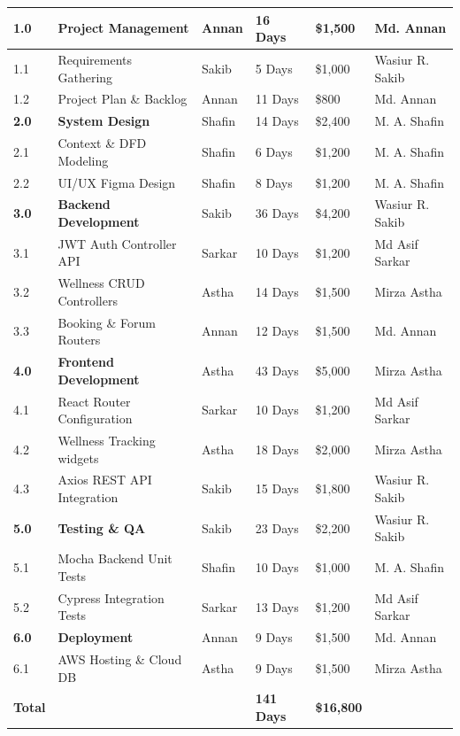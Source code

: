 \documentclass[a4paper,11pt]{report}
\begin{document}
\begin{longtable}{|p{1.2cm}|p{4.5cm}|p{2cm}|p{1.8cm}|p{1.5cm}|p{2.5cm}|}
\textbf{1.0} & \textbf{Project Management} & Annan & 16 Days & \$1,500 & Md. Annan \\ \hline
1.1 & Requirements Gathering & Sakib & 5 Days & \$1,000 & Wasiur R. Sakib \\ \hline
1.2 & Project Plan \& Backlog & Annan & 11 Days & \$800 & Md. Annan \\ \hline
\textbf{2.0} & \textbf{System Design} & Shafin & 14 Days & \$2,400 & M. A. Shafin \\ \hline
2.1 & Context \& DFD Modeling & Shafin & 6 Days & \$1,200 & M. A. Shafin \\ \hline
2.2 & UI/UX Figma Design & Shafin & 8 Days & \$1,200 & M. A. Shafin \\ \hline
\textbf{3.0} & \textbf{Backend Development} & Sakib & 36 Days & \$4,200 & Wasiur R. Sakib \\ \hline
3.1 & JWT Auth Controller API & Sarkar & 10 Days & \$1,200 & Md Asif Sarkar \\ \hline
3.2 & Wellness CRUD Controllers & Astha & 14 Days & \$1,500 & Mirza Astha \\ \hline
3.3 & Booking \& Forum Routers & Annan & 12 Days & \$1,500 & Md. Annan \\ \hline
\textbf{4.0} & \textbf{Frontend Development} & Astha & 43 Days & \$5,000 & Mirza Astha \\ \hline
4.1 & React Router Configuration & Sarkar & 10 Days & \$1,200 & Md Asif Sarkar \\ \hline
4.2 & Wellness Tracking widgets & Astha & 18 Days & \$2,000 & Mirza Astha \\ \hline
4.3 & Axios REST API Integration & Sakib & 15 Days & \$1,800 & Wasiur R. Sakib \\ \hline
\textbf{5.0} & \textbf{Testing \& QA} & Sakib & 23 Days & \$2,200 & Wasiur R. Sakib \\ \hline
5.1 & Mocha Backend Unit Tests & Shafin & 10 Days & \$1,000 & M. A. Shafin \\ \hline
5.2 & Cypress Integration Tests & Sarkar & 13 Days & \$1,200 & Md Asif Sarkar \\ \hline
\textbf{6.0} & \textbf{Deployment} & Annan & 9 Days & \$1,500 & Md. Annan \\ \hline
6.1 & AWS Hosting \& Cloud DB & Astha & 9 Days & \$1,500 & Mirza Astha \\ \hline
\textbf{Total} & & & \textbf{141 Days} & \textbf{\$16,800} & \\ \hline
\end{longtable}
\end{document}
